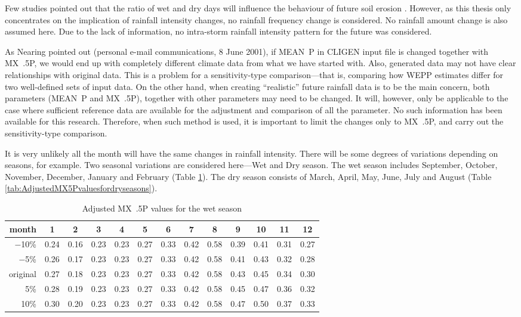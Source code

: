 Few studies pointed out that the ratio of wet and dry days will influence the
behaviour of future soil erosion
\citep{nearing2001-229,pruski2002-climate,pruski2002-7}. However, as this thesis
only concentrates on the implication of rainfall intensity changes, no rainfall
frequency change is considered. No rainfall amount change is also assumed here.
Due to the lack of information, no intra-storm rainfall intensity pattern for
the future was considered.

As Nearing pointed out (personal e-mail communications, 8 June 2001), if MEAN~P
in CLIGEN input file is changed together with MX~.5P, we would end up with
completely different climate data from what we have started with. Also,
generated data may not have clear relationships with original data. This is a
problem for a sensitivity-type comparison---that is, comparing how WEPP
estimates differ for two well-defined sets of input data. On the other hand,
when creating ``realistic'' future rainfall data is to be the main concern, both
parameters (MEAN~P and MX~.5P), together with other parameters may need to be
changed. It will, however, only be applicable to the case where sufficient
reference data are available for the adjustment and comparison of all the
parameter. No such information has been available for this research. Therefore,
when such method is used, it is important to limit the changes only to MX~.5P,
and carry out the sensitivity-type comparison.

It is very unlikely all the month will have the same changes in rainfall
intensity. There will be some degrees of variations depending on seasons, for
example. Two seasonal variations are considered here---Wet and Dry season. The
wet season includes September, October, November, December, January and February
(Table \ref{tab:AdjustedMX5Pvaluesforwetseasons}). The dry season consists of
March, April, May, June, July and August (Table
\ref{tab:AdjustedMX5Pvaluesfordryseasons}).

\begin{table}[htbp]
  \centering
  \footnotesize
  \caption{Adjusted MX~.5P values for the wet season}
  \label{tab:AdjustedMX5Pvaluesforwetseasons}
    \begin{tabular}{r|cc|cccccc|cccc}
      \toprule
      month & \textbf{1} & \textbf{2} & 3 & 4 &5& 6& 7& 8& \textbf{9}
&\textbf{10}& \textbf{11}& \textbf{12}\\
      \midrule
      $-$10\% & 0.24 & 0.16 & 0.23 & 0.23&  0.27 & 0.33 & 0.42 & 0.58 & 0.39 &
0.41 & 0.31 & 0.27\\
      $-$5\%  &0.26 & 0.17 & 0.23 & 0.23 & 0.27 & 0.33 & 0.42 & 0.58 & 0.41 &
0.43 & 0.32 & 0.28\\
      original & 0.27 & 0.18 & 0.23  &0.23 & 0.27 & 0.33 &0.42 & 0.58 & 0.43 &
0.45 & 0.34 & 0.30\\
      5\% & 0.28 & 0.19 & 0.23 & 0.23 & 0.27 & 0.33 & 0.42& 0.58 & 0.45 & 0.47 &
0.36 & 0.32\\
      10\% & 0.30 & 0.20 & 0.23 & 0.23 & 0.27 & 0.33 & 0.42 & 0.58 & 0.47& 0.50
& 0.37 & 0.33\\
      \bottomrule
    \end{tabular}
\end{table}

